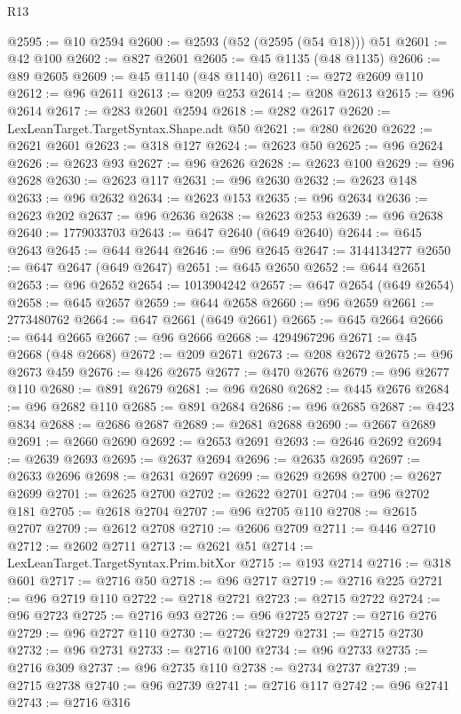 \begin{lexlean}{R13}
\begin{coremodule}
@2595 := @10 @2594
@2600 := @2593 (@52 (@2595 (@54 @18))) @51
@2601 := @42 @100
@2602 := @827 @2601
@2605 := @45 @1135 (@48 @1135)
@2606 := @89 @2605
@2609 := @45 @1140 (@48 @1140)
@2611 := @272 @2609 @110
@2612 := @96 @2611
@2613 := @209 @253
@2614 := @208 @2613
@2615 := @96 @2614
@2617 := @283 @2601 @2594
@2618 := @282 @2617
@2620 := LexLeanTarget.TargetSyntax.Shape.adt @50
@2621 := @280 @2620
@2622 := @2621 @2601
@2623 := @318 @127
@2624 := @2623 @50
@2625 := @96 @2624
@2626 := @2623 @93
@2627 := @96 @2626
@2628 := @2623 @100
@2629 := @96 @2628
@2630 := @2623 @117
@2631 := @96 @2630
@2632 := @2623 @148
@2633 := @96 @2632
@2634 := @2623 @153
@2635 := @96 @2634
@2636 := @2623 @202
@2637 := @96 @2636
@2638 := @2623 @253
@2639 := @96 @2638
@2640 := 1779033703
@2643 := @647 @2640 (@649 @2640)
@2644 := @645 @2643
@2645 := @644 @2644
@2646 := @96 @2645
@2647 := 3144134277
@2650 := @647 @2647 (@649 @2647)
@2651 := @645 @2650
@2652 := @644 @2651
@2653 := @96 @2652
@2654 := 1013904242
@2657 := @647 @2654 (@649 @2654)
@2658 := @645 @2657
@2659 := @644 @2658
@2660 := @96 @2659
@2661 := 2773480762
@2664 := @647 @2661 (@649 @2661)
@2665 := @645 @2664
@2666 := @644 @2665
@2667 := @96 @2666
@2668 := 4294967296
@2671 := @45 @2668 (@48 @2668)
@2672 := @209 @2671
@2673 := @208 @2672
@2675 := @96 @2673 @459
@2676 := @426 @2675
@2677 := @470 @2676
@2679 := @96 @2677 @110
@2680 := @891 @2679
@2681 := @96 @2680
@2682 := @445 @2676
@2684 := @96 @2682 @110
@2685 := @891 @2684
@2686 := @96 @2685
@2687 := @423 @834
@2688 := @2686 @2687
@2689 := @2681 @2688
@2690 := @2667 @2689
@2691 := @2660 @2690
@2692 := @2653 @2691
@2693 := @2646 @2692
@2694 := @2639 @2693
@2695 := @2637 @2694
@2696 := @2635 @2695
@2697 := @2633 @2696
@2698 := @2631 @2697
@2699 := @2629 @2698
@2700 := @2627 @2699
@2701 := @2625 @2700
@2702 := @2622 @2701
@2704 := @96 @2702 @181
@2705 := @2618 @2704
@2707 := @96 @2705 @110
@2708 := @2615 @2707
@2709 := @2612 @2708
@2710 := @2606 @2709
@2711 := @446 @2710
@2712 := @2602 @2711
@2713 := @2621 @51
@2714 := LexLeanTarget.TargetSyntax.Prim.bitXor
@2715 := @193 @2714
@2716 := @318 @601
@2717 := @2716 @50
@2718 := @96 @2717
@2719 := @2716 @225
@2721 := @96 @2719 @110
@2722 := @2718 @2721
@2723 := @2715 @2722
@2724 := @96 @2723
@2725 := @2716 @93
@2726 := @96 @2725
@2727 := @2716 @276
@2729 := @96 @2727 @110
@2730 := @2726 @2729
@2731 := @2715 @2730
@2732 := @96 @2731
@2733 := @2716 @100
@2734 := @96 @2733
@2735 := @2716 @309
@2737 := @96 @2735 @110
@2738 := @2734 @2737
@2739 := @2715 @2738
@2740 := @96 @2739
@2741 := @2716 @117
@2742 := @96 @2741
@2743 := @2716 @316

\end{coremodule}
\end{lexlean}
